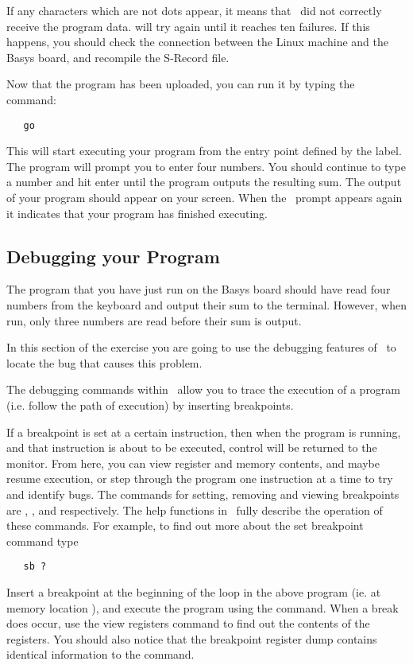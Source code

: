 If any characters which are not dots appear, it means that \WRAMPmon\ did not
correctly receive the program data.  will try again until it
reaches ten failures. If this happens, you should check the connection between
the Linux machine and the Basys board, and recompile the S-Record file.

Now that the program has been uploaded, you can run it by typing the command:
\begin{verbatim}
   go
\end{verbatim}

This will start executing your program from the entry point defined by the 
 label. The program will prompt you to enter four numbers. You should continue to type a number and hit enter until the program outputs the resulting
sum. The output of your program should appear on your screen. When the \WRAMPmon\
prompt appears again it indicates that your program has finished executing.

\subsection{Debugging your Program}
The program that you have just run on the Basys board should have read four 
numbers from the keyboard and output their sum to the terminal. However, when
run, only three numbers are read before their sum is output.

In this section of the exercise you are going to use the debugging 
features of \WRAMPmon\ to locate the bug that causes this problem.

The debugging commands within \WRAMPmon\ allow you to trace the execution 
of a program (i.e. follow the path of execution) by inserting breakpoints.

If a breakpoint is set at a certain instruction, then when the program
is running, and that instruction is about to be executed, control will
be returned to the monitor. From here, you can view register and
memory contents, and maybe resume execution, or step through the
program one instruction at a time to try and identify bugs. The
commands for setting, removing and viewing breakpoints are ,
\src{rb}, and \src{vb} respectively. The help functions in \WRAMPmon\
fully describe the operation of these commands. For example, to find
out more about the set breakpoint command type
\begin{verbatim}
   sb ?
\end{verbatim}

Insert a breakpoint at the beginning of the loop in the above program 
(ie. at memory location ), and execute the program using
the \src{go} command.
When a break does occur, use the view registers command to find out the 
contents of the registers. You should also notice that the breakpoint 
register dump contains identical information to the \src{vr} command.

